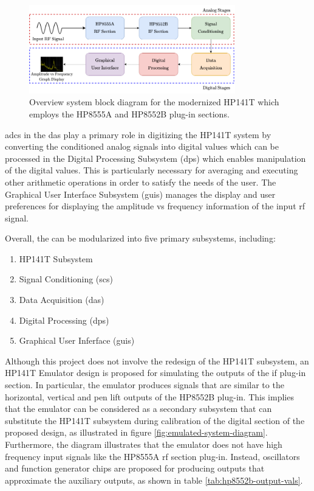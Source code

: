 \documentclass[class=report,11pt,crop=false]{standalone}
\begin{document}
	\begin{figure}[ht!]
	 	\centering
	 	\includegraphics[width=0.80\textwidth]{Figures/Methodology/overall-system-diagram}
	 	\caption{Overview system block diagram for the modernized HP141T which employs the HP8555A and HP8552B plug-in sections.}
	 	\label{fig:overall-system-block-diagram}
	 \end{figure}
	\acrshort{adc}s in the \acrshort{das} play a primary role in digitizing the HP141T system by converting the conditioned analog signals into digital values which can be processed in the Digital Processing Subsystem (\acrshort{dps}) which enables manipulation of the digital values. This is particularly necessary for averaging and executing other arithmetic operations in order to satisfy the needs of the user. The Graphical User Interface Subsystem (\acrshort{guis}) manages the display and user preferences for displaying the amplitude vs frequency information of the input \acrshort{rf} signal.
		
	Overall, the can be modularized into five primary subsystems, including:
	\begin{enumerate}
		\item 
		HP141T Subsystem
		\item 
		Signal Conditioning (\acrshort{scs})
		\item 
		Data Acquisition (\acrshort{das})
		\item 
		Digital Processing (\acrshort{dps})
		\item 
		Graphical User Inferface (\acrshort{guis})
	\end{enumerate}
	
	Although this project does not involve the redesign of the HP141T subsystem, an HP141T Emulator design is proposed for simulating the outputs of the \acrshort{if} plug-in section. In particular, the emulator produces signals that are similar to the horizontal, vertical and pen lift outputs of the HP8552B plug-in. This implies that the emulator can be considered as a secondary subsystem that can substitute the HP141T subsystem during calibration of the digital section of the proposed design, as illustrated in figure \ref{fig:emulated-system-diagram}. Furthermore, the diagram illustrates that the emulator does not have high frequency input signals like the HP8555A \acrshort{rf} section plug-in. Instead, oscillators and function generator chips are proposed for producing outputs that approximate the auxiliary outputs, as shown in table \ref{tab:hp8552b-output-vals}.
	
\end{document}
